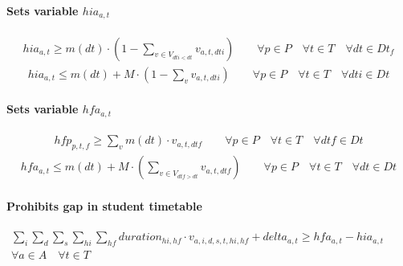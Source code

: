 \paragraph{Sets variable $hia_{a,t}$}
\begin{eqnarray}
hia_{a,t} \geq m(dt) \cdot ( 1 - \sum\limits_{v \in V_{dti<dt}} v_{a,t,dti} ) \nonumber \qquad
\forall p \in P \quad
\forall t \in T \quad
\forall dt \in Dt_{f}
\end{eqnarray}
\begin{eqnarray}
hia_{a,t} \leq m(dt) + M \cdot ( 1 - \sum\limits_{v} v_{a,t,dti} ) \nonumber \qquad
\forall p \in P \quad
\forall t \in T \quad
\forall dti \in Dt
\end{eqnarray}

\paragraph{Sets variable $hfa_{a,t}$}
\begin{eqnarray}
hfp_{p,t,f} \geq \sum\limits_{v} m(dt) \cdot v_{a,t,dtf} \nonumber \qquad
\forall p \in P \quad
\forall t \in T \quad
\forall dtf \in Dt
\end{eqnarray}
\begin{eqnarray}
hfa_{a,t} \leq m(dt) + M \cdot ( \sum\limits_{v \in V_{dtf>dt}} v_{a,t,dtf} ) \nonumber \qquad
\forall p \in P \quad
\forall t \in T \quad
\forall dt \in Dt
\end{eqnarray}

\paragraph{Prohibits gap in student timetable}
\begin{eqnarray}
\sum\limits_{i} \sum\limits_{d} \sum\limits_{s} \sum\limits_{hi} \sum\limits_{hf} duration_{hi,hf} \cdot v_{a,i,d,s,t,hi,hf} + delta_{a,t} \geq hfa_{a,t} - hia_{a,t} \nonumber \qquad
\\
\forall a \in A \quad
\forall t \in T \quad
\end{eqnarray}





\newpage

